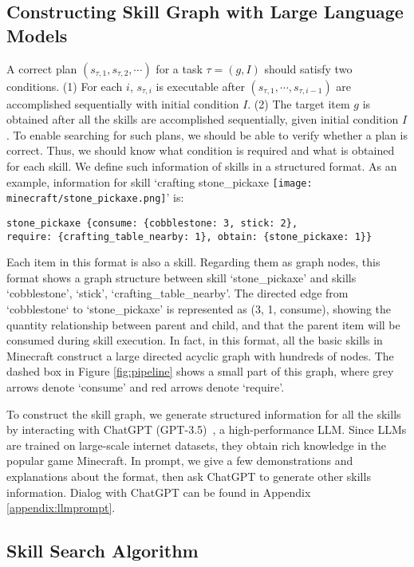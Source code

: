 \documentclass{article}
\newcommand{\mcstonepickaxe}{\texttt{[image: minecraft/stone\_pickaxe.png]}}
\begin{document}
\subsection{Constructing Skill Graph with Large Language Models}
A correct plan  $(s_{\tau,1}, s_{\tau,2}, \cdots)$ for a task $\tau=(g,I)$ should satisfy two conditions. (1) For each $i$, $s_{\tau,i}$ is executable after $(s_{\tau,1}, \cdots, s_{\tau,i-1})$ are accomplished sequentially with initial condition $I$. (2) The target item $g$ is obtained after all the skills are accomplished sequentially, given initial condition $I$. To enable searching for such plans, we should be able to verify whether a plan is correct. Thus, we should know what condition is required and what is obtained for each skill. We define such information of skills in a structured format. As an example, information for skill `crafting stone\_pickaxe \mcstonepickaxe' is:
\begin{lstlisting}
stone_pickaxe {consume: {cobblestone: 3, stick: 2}, 
require: {crafting_table_nearby: 1}, obtain: {stone_pickaxe: 1}}
\end{lstlisting}
Each item in this format is also a skill. Regarding them as graph nodes, this format shows a graph structure between skill `stone\_pickaxe' and skills `cobblestone', `stick', `crafting\_table\_nearby'. The directed edge from `cobblestone` to `stone\_pickaxe' is represented as (3, 1, consume), showing the quantity relationship between parent and child, and that the parent item will be consumed during skill execution. In fact, in this format, all the basic skills in Minecraft construct a large directed acyclic graph with hundreds of nodes. The dashed box in Figure \ref{fig:pipeline} shows a small part of this graph, where grey arrows denote `consume' and red arrows denote `require'.

To construct the skill graph, we generate structured information for all the skills by interacting with ChatGPT (GPT-3.5)~\citep{gpt}, a high-performance LLM. Since LLMs are trained on large-scale internet datasets, they obtain rich knowledge in the popular game Minecraft. In prompt, we give a few demonstrations and explanations about the format, then ask ChatGPT to generate other skills information. %
Dialog with ChatGPT can be found in Appendix \ref{appendix:llmprompt}. 

\subsection{Skill Search Algorithm}
\end{document}
